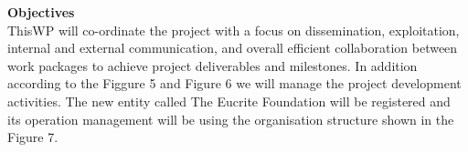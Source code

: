 \textbf{Objectives}\\
ThisWP will co-ordinate the project with a focus on dissemination, exploitation, internal and external communication, and overall efficient collaboration between work packages to achieve project deliverables and milestones. In addition according to the Figgure 5 and Figure 6 we will manage the project development activities. The new entity called The Eucrite Foundation will be registered and its operation management will be using the organisation structure shown in the Figure 7.
\par

